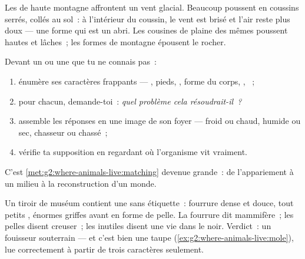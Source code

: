 \begin{example}\label{ex:g4:adapted-to-their-world:alpine}
Les  de haute montagne affrontent un vent glacial. Beaucoup
poussent en coussins serrés, collés au sol~: à l'intérieur du
coussin, le vent est brisé et l'air reste plus doux — une forme qui
est un abri. Les cousines de plaine des mêmes  poussent
hautes et lâches~; les formes de montagne épousent le rocher.
\end{example}

\begin{method}\label{met:g4:adapted-to-their-world:read}
Devant un  ou une  que tu ne connais pas~:
\begin{enumerate}
  \item énumère ses caractères frappants --- , pieds, ,
        forme du corps, , ~;
  \item pour chacun, demande-toi~: \emph{quel problème cela
        résoudrait-il~?}
  \item assemble les réponses en une image de son foyer --- froid
        ou chaud, humide ou sec, chasseur ou chassé~;
  \item vérifie ta supposition en regardant où l'organisme vit
        vraiment.
\end{enumerate}
C'est \cref{met:g2:where-animals-live:matching} devenue grande~: de
l'appariement à un milieu à la reconstruction d'un monde.
\end{method}

\begin{example}\label{ex:g4:adapted-to-their-world:mystery}
Un tiroir de muséum contient une  sans étiquette~: fourrure
dense et douce, tout petits , énormes griffes avant en forme de
pelle. La fourrure dit mammifère~; les pelles disent creuser~; les
 inutiles disent une vie dans le noir. Verdict~: un fouisseur
souterrain --- et c'est bien une taupe
(\cref{ex:g2:where-animals-live:mole}), lue correctement à partir de
trois caractères seulement.
\end{example}

